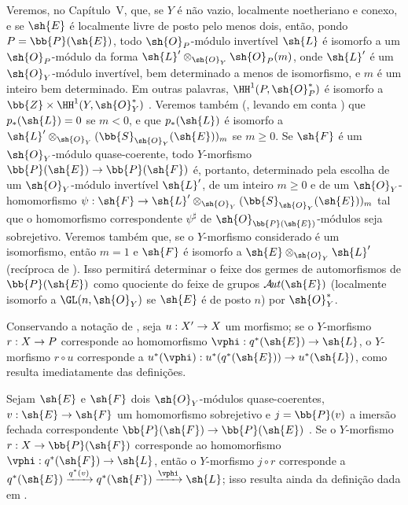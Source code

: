 \documentclass[oneside,10pt]{amsart}
\makeatletter
\renewcommand{\geq}{\geqslant}
\newcommand{\ega@arrow}[2]{\mathchoice{#1}{#2}{#2}{#2}}
\renewcommand{\to}{\ega@arrow{\longrightarrow}{\rightarrow}}
\def\shAut{\mathcal{A}\!\mathit{ut}}
\newcommand{\oldpage}[2][]{\marginnote{\normalfont\footnotesize\textbf{#1}~|~#2}\ignorespaces}
\let\EGAOriginalLabel\label
\renewcommand{\label}[1]{\phantomsection\EGAOriginalLabel{#1}}
\makeatother
\begin{document}
\begin{remark}[4.2.7]
\label{II.4.2.7}
Veremos, no Capítulo~V, que, se $Y$ é não vazio, localmente noetheriano e conexo, e se $\sh{E}$ é localmente livre de posto pelo menos dois, então, pondo $P=\bb{P}(\sh{E})$, todo $\sh{O}_P$-módulo invertível $\sh{L}$ é isomorfo a um $\sh{O}_P$-módulo da forma $\sh{L}'\otimes_{\sh{O}_Y}\sh{O}_P(m)$, onde $\sh{L}'$ é um $\sh{O}_Y$-módulo invertível, bem determinado a menos de isomorfismo, e $m$ é um inteiro bem determinado.
Em outras palavras, $\HH^1(P,\sh{O}_P^*)$ é isomorfo a $\bb{Z}\times\HH^1(Y,\sh{O}_Y^*)$ .
Veremos também (, levando em conta ) que $p_*(\sh{L})=0$ se $m<0$, e que $p_*(\sh{L})$ é isomorfo a $\sh{L}'\otimes_{\sh{O}_Y}(\bb{S}_{\sh{O}_Y}(\sh{E}))_m$ se $m\geq0$.
Se $\sh{F}$ é um $\sh{O}_Y$-módulo quase-coerente, todo $Y$-morfismo $\bb{P}(\sh{E})\to\bb{P}(\sh{F})$ é, portanto, determinado pela escolha de um $\sh{O}_Y$-módulo invertível $\sh{L}'$, de um inteiro $m\geq0$ e de um $\sh{O}_Y$-homomorfismo $\psi:\sh{F}\to\sh{L}'\otimes_{\sh{O}_Y}(\bb{S}_{\sh{O}_Y}(\sh{E}))_m$ tal que o homomorfismo correspondente $\psi^\sharp$ de $\sh{O}_{\bb{P}(\sh{E})}$-módulos seja sobrejetivo.
Veremos também que, se o $Y$-morfismo considerado é um isomorfismo, então $m=1$ e $\sh{F}$ é isomorfo a $\sh{E}\otimes_{\sh{O}_Y}\sh{L}'$ (recíproca de ).
Isso permitirá determinar o feixe dos germes de automorfismos de $\bb{P}(\sh{E})$ como quociente do feixe de grupos $\shAut(\sh{E})$ (localmente isomorfo a $\GL(n,\sh{O}_Y)$ se $\sh{E}$ é de posto $n$) por $\sh{O}_Y^*$.
\end{remark}

\begin{env}[4.2.8]
\label{II.4.2.8}
Conservando a notação de , seja $u:X'\to X$ um morfismo;
se o $Y$-morfismo $r:X\to P$ corresponde ao homomorfismo $\vphi:q^*(\sh{E})\to\sh{L}$, o $Y$-morfismo $r\circ u$ corresponde a $u^*(\vphi):u^*(q^*(\sh{E}))\to u^*(\sh{L})$, como resulta imediatamente das definições.
\end{env}

\begin{env}[4.2.9]
\label{II.4.2.9}
Sejam $\sh{E}$ e $\sh{F}$ dois $\sh{O}_Y$-módulos quase-coerentes, $v:\sh{E}\to\sh{F}$ um homomorfismo sobrejetivo e $j=\bb{P}(v)$ a imersão fechada correspondente $\bb{P}(\sh{F})\to\bb{P}(\sh{E})$ .
Se o $Y$-morfismo $r:X\to\bb{P}(\sh{F})$ corresponde ao homomorfismo $\vphi:q^*(\sh{F})\to\sh{L}$, então o
\oldpage[II]{76}
$Y$-morfismo $j\circ r$ corresponde a $q^*(\sh{E})\xrightarrow{q^*(v)}q^*(\sh{F})\xrightarrow{\vphi}\sh{L}$;
isso resulta ainda da definição dada em .
\end{env}
\end{document}
